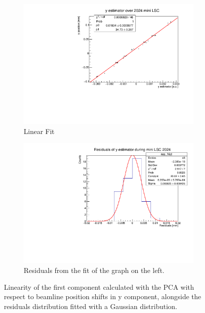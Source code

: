 \begin{figure}
    \centering
    \begin{subfigure}{0.48\textwidth}
    \includegraphics[width=\linewidth]{figures/y_fit_new.pdf}
    \caption{Linear Fit}\label{fig:yfit_data}
    \end{subfigure}
    \begin{subfigure}{0.48\textwidth}
    \includegraphics[width=\linewidth]{figures/y_res_new.pdf}
    \caption{Residuals from the fit of the graph on the left. }\label{fig:yres_data}
    \end{subfigure}
    \caption{Linearity of the first component calculated with the PCA with respect to beamline position shifts in y component, alongside the residuals distribution fitted with a Gaussian distribution.}
    \label{fig:y_data}
\end{figure}


